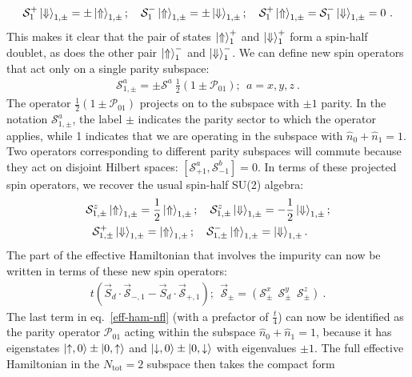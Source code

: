\begin{eqnarray}
	\mathcal{S}_1^+ \ket{\Downarrow}_{1,\pm} = \pm \ket{\Uparrow}_{1,\pm}; \quad\mathcal{S}_1^- \ket{\Uparrow}_{1,\pm} = \pm \ket{\Downarrow}_{1,\pm}; \quad\mathcal{S}_1^+ \ket{\Uparrow}_{1,\pm} = \mathcal{S}_1^- \ket{\Downarrow}_{1,\pm} = 0~.
\end{eqnarray}
This makes it clear that the pair of states \(\ket{\Uparrow}^{+}_1\) and \(\ket{\Downarrow}^{+}_1\) form a spin-half doublet, as does the other pair \(\ket{\Uparrow}^{-}_1\) and \(\ket{\Downarrow}^{-}_1\). We can define new spin operators that act only on a single parity subspace:
\begin{eqnarray}
	\mathcal{S}^a_{1,\pm} = \pm \mathcal{S}^a ~\frac{1}{2}\left(1 \pm \mathcal{P}_{01}\right);~ ~ a=x,y,z~.
\end{eqnarray}
The operator \(\frac{1}{2}\left(1 \pm \mathcal{P}_{01}\right)\) projects on to the subspace with \(\pm 1\) parity. In the notation \(\mathcal{S}^a_{1,\pm}\), the label \(\pm\) indicates the parity sector to which the operator applies, while 1 indicates that we are operating in the subspace with \(\hat n_0 + \hat n_1 = 1\). Two operators corresponding to different parity subspaces will commute because they act on disjoint Hilbert spaces: \(\left[\mathcal{S}^a_{+1}, \mathcal{S}^b_{-1}\right] = 0\). In terms of these projected spin operators, we recover the usual spin-half SU(2) algebra:
\begin{eqnarray}
	\mathcal{S}^z_{1,\pm} \ket{\Uparrow}_{1,\pm} = \frac{1}{2}\ket{\Uparrow}_{1,\pm}; \quad\mathcal{S}^z_{1,\pm}\ket{\Downarrow}_{1,\pm} = -\frac{1}{2}\ket{\Downarrow}_{1,\pm};\nonumber\\
	\mathcal{S}^+_{1,\pm} \ket{\Downarrow}_{1,\pm} = \ket{\Uparrow}_{1,\pm}; \quad\mathcal{S}^-_{1,\pm} \ket{\Uparrow}_{1,\pm} = \ket{\Downarrow}_{1,\pm}.\qquad
\end{eqnarray}
The part of the effective Hamiltonian that involves the impurity can now be written in terms of these new spin operators:
\begin{eqnarray}
	t\left(\vec{S}_d\cdot\vec{\mathcal{S}}_{-,1} - \vec{S}_d\cdot\vec{\mathcal{S}}_{+,1}\right); ~ ~ \vec{\mathcal{S}}_{\pm} = \left(\mathcal{S}_{\pm}^x ~ ~ \mathcal{S}_{\pm}^y ~ ~\mathcal{S}_{\pm}^z\right)~.
\end{eqnarray}
The last term in eq.~\eqref{eff-ham-nfl} (with a prefactor of \(\frac{t}{4}\)) can now be identified as the parity operator \(\mathcal{P}_{01}\) acting within the subspace \(\hat n_0 + \hat n_1 = 1\), because it has eigenstates \(\ket{\uparrow,0}\pm\ket{0,\uparrow}\) and \(\ket{\downarrow,0}\pm\ket{0,\downarrow}\) with eigenvalues \(\pm 1\). The full effective Hamiltonian in the \(N_\text{tot}=2\) subspace then takes the compact form
